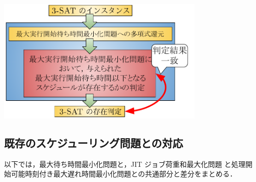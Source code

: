 \documentclass[12pt]{optlab-bachelor}
\begin{document}
\begin{center}
  \includegraphics[width = 10cm]{figure/reduction.pdf}
\end{center}

\subsection{既存のスケジューリング問題との対応}
以下では，最大待ち時間最小化問題と，JIT ジョブ荷重和最大化問題
と処理開始可能時刻付き最大遅れ時間最小化問題との共通部分と差分をまとめる．
\end{document}
